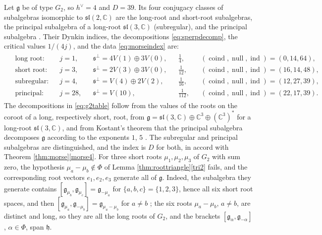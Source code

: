 \documentclass [leqno, 10pt]{amsart}
\theoremstyle{definition}
\numberwithin{equation}{section}
\newcommand{\h}{\mathfrak{h}}
\newcommand{\al}{\alpha}
\newcommand{\sll}{\mathfrak{sl}}
\newcommand{\g}{\mathfrak{g}}
\newcommand{\com}{\mathbb C}
\newcommand{\hv}{h^\vee}
\newcommand{\subs}{\mathfrak{s}}
\begin{document}
\begin{example}\label{ex:g2}
Let $\g$ be of type $G_{2}$, so $\hv = 4$ and $D = 39$. Its four conjugacy classes of subalgebras isomorphic to $\sll(2, \com)$ are the long-root and short-root subalgebras, the principal subalgebra of a long-root $\sll(3, \com)$ (subregular), and the principal subalgebra \cite{Collingwood-McGovern, Dynkin-semisimplesubalgebras}. Their Dynkin indices, the decompositions \eqref{eq:sperpdecomp}, the critical values $1/(4j)$, and the data \eqref{eq:morseindex} are:
\begin{align}\label{eq:g2table}
\begin{aligned}
&\text{long root:} && j = 1, && \subs^{\perp} = 4V(1) \oplus 3V(0), && \tfrac{1}{4}, && (\operatorname{coind}, \operatorname{null}, \operatorname{ind}) = (0, 14, 64),\\
&\text{short root:} && j = 3, && \subs^{\perp} = 2V(3) \oplus 3V(0), && \tfrac{1}{12}, && (\operatorname{coind}, \operatorname{null}, \operatorname{ind}) = (16, 14, 48),\\
&\text{subregular:} && j = 4, && \subs^{\perp} = V(4) \oplus 2V(2), && \tfrac{1}{16}, && (\operatorname{coind}, \operatorname{null}, \operatorname{ind}) = (12, 27, 39),\\
&\text{principal:} && j = 28, && \subs^{\perp} = V(10), && \tfrac{1}{112}, && (\operatorname{coind}, \operatorname{null}, \operatorname{ind}) = (22, 17, 39).
\end{aligned}
\end{align}
The decompositions in \eqref{eq:g2table} follow from the values of the roots on the coroot of a long, respectively short, root, from $\g = \sll(3, \com) \oplus \com^{3} \oplus (\com^{3})^{\ast}$ for a long-root $\sll(3, \com)$, and from Kostant's theorem that the principal subalgebra decomposes $\g$ according to the exponents $1$, $5$ \cite{Kostant-triples}. The subregular and principal subalgebras are distinguished, and the index is $D$ for both, in accord with Theorem \ref{thm:morse}\ref{morse4}. For three short roots $\mu_{1}, \mu_{2}, \mu_{3}$ of $G_{2}$ with sum zero, the hypothesis $\mu_{a} - \mu_{b} \notin \Phi$ of Lemma \ref{thm:roottriangle}\ref{tri2} fails, and the corresponding root vectors $e_{1}, e_{2}, e_{3}$ generate all of $\g$. Indeed, the subalgebra they generate contains $[\g_{\mu_{b}}, \g_{\mu_{c}}] = \g_{-\mu_{a}}$ for $\{a, b, c\} = \{1, 2, 3\}$, hence all six short root spaces, and then $[\g_{\mu_{a}}, \g_{-\mu_{b}}] = \g_{\mu_{a} - \mu_{b}}$ for $a \neq b$ \cite[Proposition~8.4]{Humphreys}; the six roots $\mu_{a} - \mu_{b}$, $a \neq b$, are distinct and long, so they are all the long roots of $G_{2}$, and the brackets $[\g_{\al}, \g_{-\al}]$, $\al \in \Phi$, span $\h$.
\end{example}
\end{document}
